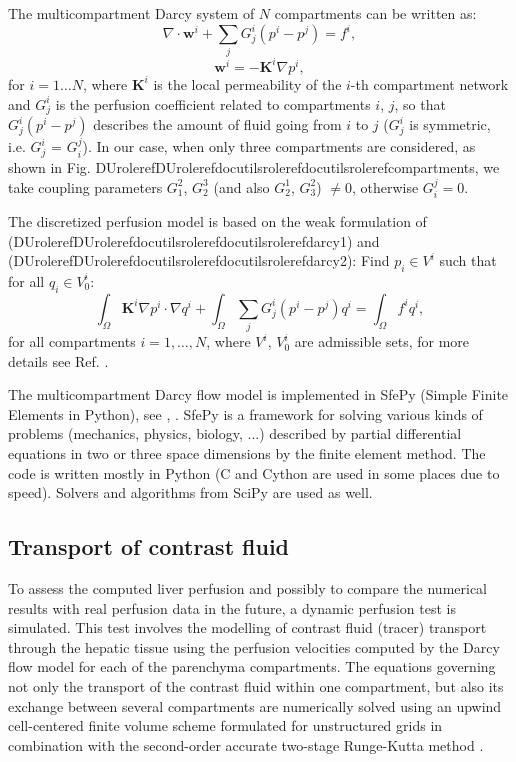 \documentclass[letterpaper,compsoc,twoside]{IEEEtran}
\providecommand*{\DUrole}[2]{\ifcsname DUrole#1\endcsname \csname DUrole#1\endcsname{#2}\else \ifcsname docutilsrole#1\endcsname \csname docutilsrole#1\endcsname{#2}\else #2\fi \fi }
\begin{document}
The multicompartment Darcy system of $N$ compartments can be
written as:\begin{equation}
\label{darcy1}
\nabla \cdot \mathbf{w}^i + \sum_{j} G_j^i(p^i - p^j) = f^i,
\end{equation}\begin{equation}
\label{darcy2}
\mathbf{w}^i = - \mathbf{K}^i \nabla p^i,
\end{equation}for $i = 1\dots N$, where $\mathbf{K}^i$ is the local
permeability of the $i$-th compartment network and $G_j^i$
is the perfusion coefficient related to compartments $i$,
$j$, so that $G_j^i(p^i - p^j)$ describes the amount of
fluid going from $i$ to $j$ ($G_j^i$ is symmetric,
i.e. $G_j^i$ = $G_i^j$). In our case, when only three
compartments are considered, as shown in Fig. \DUrole{ref}{compartments}, we
take coupling parameters $G_1^2$, $G_2^3$ (and also
$G_2^1$, $G_3^2$) $\neq 0$, otherwise $G_i^j =
0$.

The discretized perfusion model is based on the weak formulation of
(\DUrole{ref}{darcy1}) and (\DUrole{ref}{darcy2}): Find $p_i \in V^i$ such
that for all $q_i \in V^i_0$:\begin{equation}
\label{darcy3}
 \int_{\Omega} \mathbf{K}^i \nabla p^i \cdot \nabla q^i +
 \int_{\Omega} \sum_j G_{j}^i(p^i - p^j) q^i = \int_{\Omega} f^i
 q^i,
\end{equation}for all compartments $i = 1,\dots,N$, where $V^i$,
$V^i_0$ are admissible sets, for more details see
Ref. \cite{Roh12}.

The multicompartment Darcy flow model is implemented in SfePy (Simple
Finite Elements in Python), see \cite{Cim14}, \cite{Cim14b}. SfePy is a framework
for solving various kinds of problems (mechanics, physics, biology, ...)
described by partial differential equations in two or three
space dimensions by the finite element method. The code is written
mostly in Python (C and Cython are used in some places due to
speed). Solvers and algorithms from SciPy \cite{Jon14} are used as well.

\subsection{Transport of contrast fluid\label{transport-of-contrast-fluid}}


To assess the computed liver perfusion and possibly to compare the
numerical results with real perfusion data in the future, a dynamic
perfusion test is simulated. This test involves the modelling of
contrast fluid (tracer) transport through the hepatic tissue using the
perfusion velocities computed by the Darcy flow model for each of the
parenchyma compartments. The equations governing not only the
transport of the contrast fluid within one compartment, but also its
exchange between several compartments are numerically solved using an
upwind cell-centered finite volume scheme formulated for unstructured
grids in combination with the second-order accurate two-stage
Runge-Kutta method \cite{Joa14}.
\end{document}
